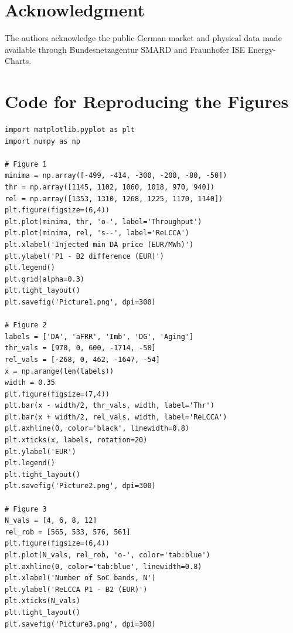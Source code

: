 \documentclass[journal,12pt,twocolumn]{IEEEtran}
\begin{document}
\section*{Acknowledgment}
The authors acknowledge the public German market and physical data made available through Bundesnetzagentur SMARD and Fraunhofer ISE Energy-Charts.

\appendices
\section{Code for Reproducing the Figures}
\begin{verbatim}
import matplotlib.pyplot as plt
import numpy as np

# Figure 1
minima = np.array([-499, -414, -300, -200, -80, -50])
thr = np.array([1145, 1102, 1060, 1018, 970, 940])
rel = np.array([1353, 1310, 1268, 1225, 1170, 1140])
plt.figure(figsize=(6,4))
plt.plot(minima, thr, 'o-', label='Throughput')
plt.plot(minima, rel, 's--', label='ReLCCA')
plt.xlabel('Injected min DA price (EUR/MWh)')
plt.ylabel('P1 - B2 difference (EUR)')
plt.legend()
plt.grid(alpha=0.3)
plt.tight_layout()
plt.savefig('Picture1.png', dpi=300)

# Figure 2
labels = ['DA', 'aFRR', 'Imb', 'DG', 'Aging']
thr_vals = [978, 0, 600, -1714, -58]
rel_vals = [-268, 0, 462, -1647, -54]
x = np.arange(len(labels))
width = 0.35
plt.figure(figsize=(7,4))
plt.bar(x - width/2, thr_vals, width, label='Thr')
plt.bar(x + width/2, rel_vals, width, label='ReLCCA')
plt.axhline(0, color='black', linewidth=0.8)
plt.xticks(x, labels, rotation=20)
plt.ylabel('EUR')
plt.legend()
plt.tight_layout()
plt.savefig('Picture2.png', dpi=300)

# Figure 3
N_vals = [4, 6, 8, 12]
rel_rob = [565, 533, 576, 561]
plt.figure(figsize=(6,4))
plt.plot(N_vals, rel_rob, 'o-', color='tab:blue')
plt.axhline(0, color='tab:blue', linewidth=0.8)
plt.xlabel('Number of SoC bands, N')
plt.ylabel('ReLCCA P1 - B2 (EUR)')
plt.xticks(N_vals)
plt.tight_layout()
plt.savefig('Picture3.png', dpi=300)
\end{verbatim}



\end{document}
